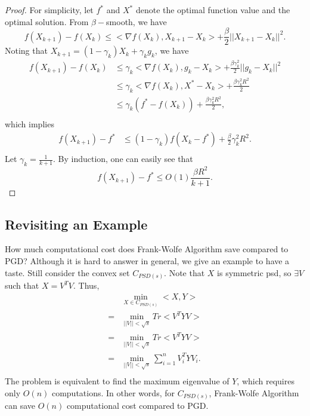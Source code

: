 \documentclass[12pt]{report}
\begin{document}
\begin{proof}
For simplicity, let $f^*$ and $X^*$ denote the optimal function value and the optimal solution.
From $\beta-$smooth, we have 
\begin{equation}
	f(X_{k+1}) - f(X_{k}) \leq  < \nabla f(X_k), X_{k+1} - X_{k}> +\frac{\beta}{2} || X_{k+1} - X_{k}||^2.
\end{equation}
Noting that $X_{k+1} = (1-\gamma_k) X_k +\gamma_k g_k$, we have
\begin{equation}
\begin{split}
f(X_{k+1}) - f(X_{k}) &\leq \gamma_k < \nabla f(X_k), g_k - X_{k}> +\frac{\beta \gamma_k^2 }{2} || g_{k} - X_{k}||^2\\
&\leq  \gamma_k < \nabla f(X_k), X^* - X_k > +\frac{\beta \gamma_k^2 R^2 }{2}\\
&\leq   \gamma_k (f^* - f(X_k)) +\frac{\beta \gamma_k^2 R^2 }{2},\\
\end{split}
\end{equation}
which implies 
\begin{equation}
\begin{split}
f(X_{k+1}) - f^* &\leq (1-\gamma_k)f(X_{k}-f^*) + \frac{\beta}{2} \gamma_k^2 R^2.\\
\end{split}
\end{equation}
Let $\gamma_k = \frac{1}{k+1}$. By induction, one can easily see that 
\begin{equation}
f(X_{k+1}) - f^* \leq O(1) \frac{\beta R^2}{k+1}.
\end{equation}

\end{proof}

\subsection{Revisiting an Example}
How much computational cost does Frank-Wolfe Algorithm save compared to PGD? Although it is hard to answer in general, we give an example to have a taste. Still consider the
convex set $C_{PSD(s)}$. Note that $X$ is symmetric psd, so $\exists V$ such that $X = V^T V$. Thus,
\begin{equation}
\begin{split}
&\min_{X\in C_{PSD(s)} } <X,Y>\\ 
=&\min_{ || V|| < \sqrt{s} } Tr<V^T Y V>\\ 
=&\min_{ || V|| < \sqrt{s} } Tr<V^T Y V>\\ 
=&\min_{ || V|| < \sqrt{s} } \sum_{i=1}^{n} V_i^T Y V_i.\\ 
\end{split}
\end{equation}
The problem is equivalent to find the maximum eigenvalue of $Y$, which requires only $O(n)$ computations. In other words, for $C_{PSD(s)}$, Frank-Wolfe Algorithm can save $O(n)$ computational cost compared to PGD.
\end{document}
